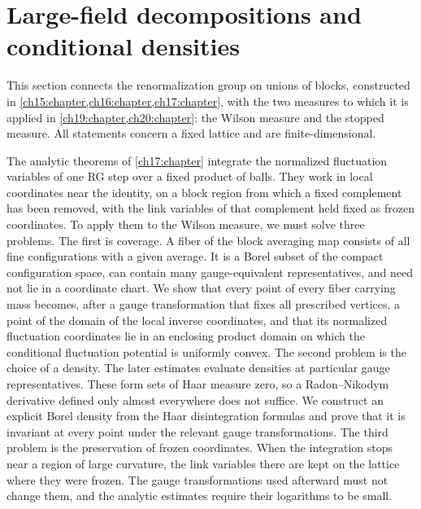 \chapter{Large-field decompositions and conditional densities}\label{ch18:chapter}

This section connects the renormalization group on unions of blocks, constructed in \cref{ch15:chapter,ch16:chapter,ch17:chapter}, with the two measures to which it is applied in \cref{ch19:chapter,ch20:chapter}: the Wilson measure and the stopped measure. All statements concern a fixed lattice and are finite-dimensional.

The analytic theorems of \cref{ch17:chapter} integrate the normalized fluctuation variables of one RG step over a fixed product of balls. They work in local coordinates near the identity, on a block region from which a fixed complement has been removed, with the link variables of that complement held fixed as frozen coordinates. To apply them to the Wilson measure, we must solve three problems. The first is coverage. A fiber of the block averaging map consists of all fine configurations with a given average. It is a Borel subset of the compact configuration space, can contain many gauge-equivalent representatives, and need not lie in a coordinate chart. We show that every point of every fiber carrying mass becomes, after a gauge transformation that fixes all prescribed vertices, a point of the domain of the local inverse coordinates, and that its normalized fluctuation coordinates lie in an enclosing product domain on which the conditional fluctuation potential is uniformly convex. The second problem is the choice of a density. The later estimates evaluate densities at particular gauge representatives. These form sets of Haar measure zero, so a Radon--Nikodym derivative defined only almost everywhere does not suffice. We construct an explicit Borel density from the Haar disintegration formulas and prove that it is invariant at every point under the relevant gauge transformations. The third problem is the preservation of frozen coordinates. When the integration stops near a region of large curvature, the link variables there are kept on the lattice where they were frozen. The gauge transformations used afterward must not change them, and the analytic estimates require their logarithms to be small.

